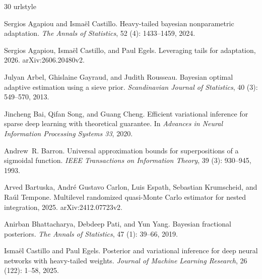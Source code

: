 \documentclass[11pt,a4paper]{article}
\theoremstyle{remark}
\begin{document}
\begin{thebibliography}{30}
\providecommand{\natexlab}[1]{#1}
\providecommand{\url}[1]{\texttt{#1}}
\expandafter\ifx\csname urlstyle\endcsname\relax
  \providecommand{\doi}[1]{doi: #1}\else
  \providecommand{\doi}{doi: \begingroup \urlstyle{rm}\Url}\fi

Sergios Agapiou and Isma{\"e}l Castillo.
\newblock Heavy-tailed bayesian nonparametric adaptation.
\newblock \emph{The Annals of Statistics}, 52 (4):
  1433--1459, 2024.

Sergios Agapiou, Isma{\"e}l Castillo, and Paul Egels.
\newblock Leveraging tails for adaptation, 2026.
\newblock arXiv:2606.20480v2.

Julyan Arbel, Ghislaine Gayraud, and Judith Rousseau.
\newblock Bayesian optimal adaptive estimation using a sieve prior.
\newblock \emph{Scandinavian Journal of Statistics}, 40 (3):
  549--570, 2013.

Jincheng Bai, Qifan Song, and Guang Cheng.
\newblock Efficient variational inference for sparse deep learning with
  theoretical guarantee.
\newblock In \emph{Advances in Neural Information Processing Systems 33}, 2020.

Andrew~R. Barron.
\newblock Universal approximation bounds for superpositions of a sigmoidal
  function.
\newblock \emph{IEEE Transactions on Information Theory}, 39
  (3): 930--945, 1993.

Arved Bartuska, Andr{\'e} Gustavo Carlon, Luis Espath, Sebastian Krumscheid,
  and Ra{\'u}l Tempone.
\newblock Multilevel randomized quasi-{Monte Carlo} estimator for nested
  integration, 2025.
\newblock arXiv:2412.07723v2.

Anirban Bhattacharya, Debdeep Pati, and Yun Yang.
\newblock Bayesian fractional posteriors.
\newblock \emph{The Annals of Statistics}, 47 (1): 39--66,
  2019.

Isma{\"e}l Castillo and Paul Egels.
\newblock Posterior and variational inference for deep neural networks with
  heavy-tailed weights.
\newblock \emph{Journal of Machine Learning Research}, 26
  (122): 1--58, 2025.


\end{thebibliography}
\end{document}
